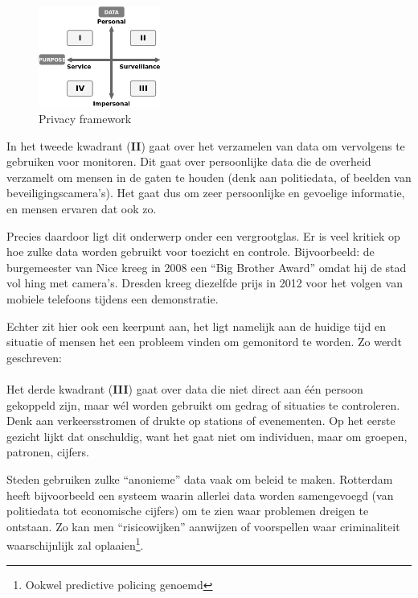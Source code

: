 \documentclass[nonacm,sigconf]{acmart}
\begin{document}
    \begin{figure}[ht!]
        \centering
        \includegraphics[width=40mm]{images/SmartCityPrivacy}
        \caption{Privacy framework {\parencite[nagemaakt van][]{van2016privacy}}}
        \label{fig:privacy_framework}
    \end{figure}

    In het tweede kwadrant (\textbf{II}) gaat over het verzamelen van data om vervolgens te gebruiken voor monitoren.
    Dit gaat over persoonlijke data die de overheid verzamelt om mensen in de gaten te houden (denk aan politiedata, of beelden van beveiligingscamera’s).
    Het gaat dus om zeer persoonlijke en gevoelige informatie, en mensen ervaren dat ook zo.

    Precies daardoor ligt dit onderwerp onder een vergrootglas.
    Er is veel kritiek op hoe zulke data worden gebruikt voor toezicht en controle.
    Bijvoorbeeld: de burgemeester van Nice kreeg in 2008 een “Big Brother Award” omdat hij de stad vol hing met camera’s.
    Dresden kreeg diezelfde prijs in 2012 voor het volgen van mobiele telefoons tijdens een demonstratie.

    Echter zit hier ook een keerpunt aan, het ligt namelijk aan de huidige tijd en situatie of mensen het een probleem vinden om gemonitord te worden.
    Zo werdt geschreven:
    \\
    \\
    Het derde kwadrant (\textbf{III}) gaat over data die niet direct aan één persoon gekoppeld zijn, maar wél worden gebruikt om gedrag of situaties te controleren.
    Denk aan verkeersstromen of drukte op stations of evenementen.
    Op het eerste gezicht lijkt dat onschuldig, want het gaat niet om individuen, maar om groepen, patronen, cijfers.

    Steden gebruiken zulke “anonieme” data vaak om beleid te maken.
    Rotterdam heeft bijvoorbeeld een systeem waarin allerlei data worden samengevoegd (van politiedata tot economische cijfers) om te zien waar problemen dreigen te ontstaan.
    Zo kan men “risicowijken” aanwijzen of voorspellen waar criminaliteit waarschijnlijk zal oplaaien\footnote{Ookwel predictive policing genoemd}.
\end{document}

